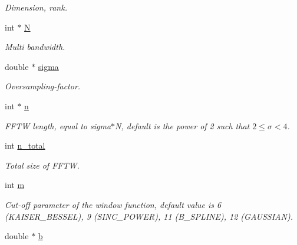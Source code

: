 \begin{CompactItemize}
\begin{CompactList}\small\item\em Dimension, rank. \item\end{CompactList}\item 
\hypertarget{structnfft__plan_o5}{
int $\ast$ \hyperlink{structnfft__plan_o5}{N}}
\label{structnfft__plan_o5}

\begin{CompactList}\small\item\em Multi bandwidth. \item\end{CompactList}\item 
\hypertarget{structnfft__plan_o6}{
double $\ast$ \hyperlink{structnfft__plan_o6}{sigma}}
\label{structnfft__plan_o6}

\begin{CompactList}\small\item\em Oversampling-factor. \item\end{CompactList}\item 
\hypertarget{structnfft__plan_o7}{
int $\ast$ \hyperlink{structnfft__plan_o7}{n}}
\label{structnfft__plan_o7}

\begin{CompactList}\small\item\em FFTW length, equal to sigma$\ast$N, default is the power of 2 such that $2\le\sigma<4$. \item\end{CompactList}\item 
\hypertarget{structnfft__plan_o8}{
int \hyperlink{structnfft__plan_o8}{n\_\-total}}
\label{structnfft__plan_o8}

\begin{CompactList}\small\item\em Total size of FFTW. \item\end{CompactList}\item 
\hypertarget{structnfft__plan_o9}{
int \hyperlink{structnfft__plan_o9}{m}}
\label{structnfft__plan_o9}

\begin{CompactList}\small\item\em Cut-off parameter of the window function, default value is 6 (KAISER\_\-BESSEL), 9 (SINC\_\-POWER), 11 (B\_\-SPLINE), 12 (GAUSSIAN). \item\end{CompactList}\item 
\hypertarget{structnfft__plan_o10}{
double $\ast$ \hyperlink{structnfft__plan_o10}{b}}
\label{structnfft__plan_o10}


\end{CompactItemize}
